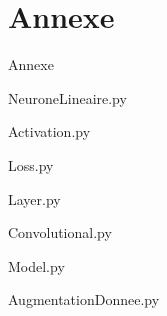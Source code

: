 \section{Annexe}
\begin{frame}{Annexe}
    
\end{frame}


\begin{frame}{NeuroneLineaire.py}
    
\end{frame}


\begin{frame}{Activation.py}
    
\end{frame}


\begin{frame}{Loss.py}
    
\end{frame}


\begin{frame}{Layer.py}
    
\end{frame}


\begin{frame}{Convolutional.py}
    

\end{frame}


\begin{frame}{Model.py}
    
\end{frame}


\begin{frame}{AugmentationDonnee.py}
    
\end{frame}






